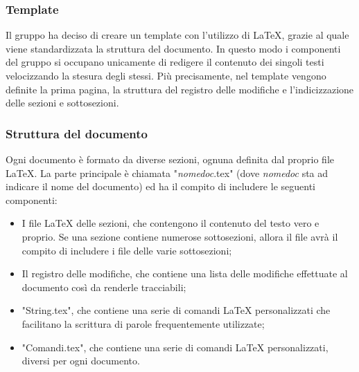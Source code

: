 \subsubsection{Template}
Il gruppo ha deciso di creare un template con l'utilizzo di \LaTeX{}, grazie al quale viene standardizzata la struttura del documento. In questo modo i componenti del gruppo si occupano unicamente di redigere il contenuto dei singoli testi velocizzando la stesura degli stessi. Più precisamente, nel template vengono definite la prima pagina, la struttura del registro delle modifiche e l'indicizzazione delle sezioni e sottosezioni.

\subsubsection{Struttura del documento}
Ogni documento è formato da diverse sezioni, ognuna definita dal proprio file \LaTeX. La parte principale è chiamata "\textit{nomedoc}.tex" (dove \textit{nomedoc} sta ad indicare il nome del documento) ed ha il compito di includere le seguenti componenti:
\begin{itemize}
	\item I file \LaTeX{} delle sezioni, che contengono il contenuto del testo vero e proprio. Se una sezione contiene numerose sottosezioni, allora il file avrà il compito di includere i file delle varie sottosezioni;
	
	\item Il registro delle modifiche, che contiene una lista delle modifiche effettuate al documento così da renderle tracciabili;
	
	\item "String.tex", che contiene una serie di comandi \LaTeX{} personalizzati che facilitano la scrittura di parole frequentemente utilizzate;
	
	\item "Comandi.tex", che contiene una serie di comandi \LaTeX{} personalizzati, diversi per ogni documento.
\end{itemize}

